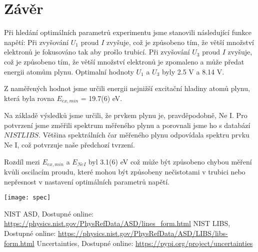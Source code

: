 \documentclass[a4paper,11pt]{article}
\begin{document}
\begin{minipage}[t]{0.5\textwidth}
        \section{Závěr}
                \par Při hledání optimálních parametrů experimentu jsme stanovili následující funkce napětí: Při zvyšování $U_1$ proud $I$ zvyšuje, což je způsobeno tím, že větší množství elektronů je fokusováno tak aby prošlo trubicí. Při zvyšování $U_3$ proud $I$ zvyšuje, což je způsobeno tím, že větší množství elektronů je zpomaleno a může předat energii atomům plynu. Optimalní hodnoty $U_1$ a $U_3$ byly 2.5 V a 8.14 V.
                \par Z naměřených hodnot jsme určili energii nejnižší excitační hladiny atomů plynu, která byla rovna $E_{ex, min}$ = 19.7(6) eV. 
                \par Na základě výsledků jsme určili, že prvkem plynu je, pravděpodobně, Ne I. Pro potvrzení jsme změřili spektrum měřeného plynu a porovnali jsme ho s databází $NIST LIBS$. Většina spektrálních čar měřeného plynu odpovídala spektru prvku Ne I, což potvrzuje naše předchozí tvrzení.
                \par Rozdíl mezi $E_{ex, min}$ a $E_{Ne I}$ byl 3.1(6) eV což může být způsobeno chybou měření kvůli oscilacím proudu, které mohou být způsobeny nečistotami v trubici nebo nepřesnost v nastavení optimálních parametrů napětí.
    \end{minipage}
\newpage
                \vspace{10pt}   
                \par \centering
                \texttt{[image: spec]}
                \captionsetup{justification=centering, font=footnotesize}
                \label{fig:spec}
                \vspace{10pt}
                \raggedright 

                \renewcommand{\refname}{Odkazy}
                \begin{thebibliography}{9}
                        NIST ASD, Dostupné online: \url{https://physics.nist.gov/PhysRefData/ASD/lines_form.html}
                        NIST LIBS, Dostupné online: \url{https://physics.nist.gov/PhysRefData/ASD/LIBS/libs-form.html}
                        Uncertainties, Dostupné online: \url{https://pypi.org/project/uncertainties}
                \end{thebibliography} 
\end{document}
